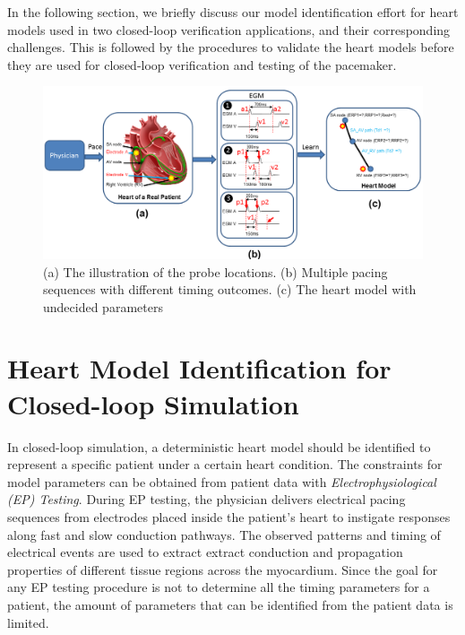 In the following section, we briefly discuss our model identification effort for heart models used in two closed-loop verification applications, and their corresponding challenges. This is followed by the procedures to validate the heart models before they are used for closed-loop verification and testing of the pacemaker.
\begin{figure}[!t]
\centering
		\includegraphics[width=0.9  \textwidth]{figs/modelID.png}
		
\caption{\small (a) The illustration of the probe locations. (b) Multiple pacing sequences with different timing outcomes. (c) The heart model with undecided parameters}
\label{fig:modelID}
\end{figure} 

\section{Heart Model Identification for Closed-loop Simulation}
In closed-loop simulation, a deterministic heart model should be identified to represent a specific patient under a certain heart condition. The constraints for model parameters can be obtained from patient data with \emph{Electrophysiological (EP) Testing}. During EP testing, the physician delivers electrical pacing sequences from electrodes placed inside the patient's heart to instigate responses along fast and slow conduction pathways. The observed patterns and timing of electrical events are used to extract extract conduction and propagation properties of different tissue regions across the myocardium. Since the goal for any EP testing procedure is not to determine all the timing parameters for a patient, the amount of parameters that can be identified from the patient data is limited.    

